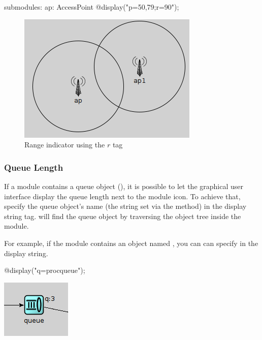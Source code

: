 \begin{ned}
submodules:
    ap: AccessPoint {
        @display("p=50,79;r=90");
    }
\end{ned}

\begin{figure}[htbp]
  \begin{center}
    \includegraphics{figures/graphics-rtag}
    \caption{Range indicator using the $r$ tag}
    \label{fig:graphics-rtag}
  \end{center}
\end{figure}

\subsubsection{Queue Length}

If a module contains a queue object (), it is possible to
let the graphical user interface display the queue length next to the
module icon. To achieve that, specify the queue object's name (the string
set via the  method) in the  display string tag.
{\opp} will find the queue object by traversing the object tree inside
the module.

For example, if the module contains an  object named
, you can can specify  in the display
string.

\begin{ned}
@display("q=procqueue");
\end{ned}

\begin{center}
\includegraphics{figures/graphics-qtag}
\end{center}

